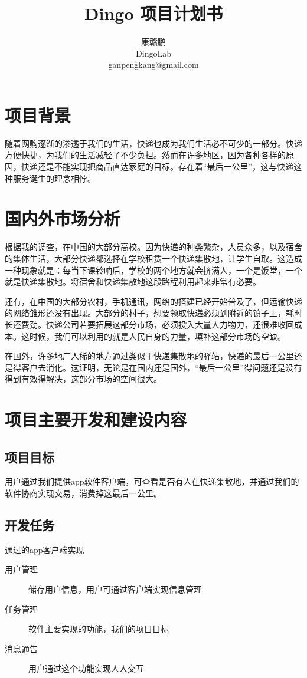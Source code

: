 \documentclass[UTF8]{dingo}
\author{康赣鹏 \\ DingoLab \\ganpengkang@gmail.com}
\title{Dingo 项目计划书}
\begin{document}
  \makecover
  \makecontent
  \section{项目背景}
  随着网购逐渐的渗透于我们的生活，快递也成为我们生活必不可少的一部分。快递方便快捷，为我们的生活减轻了不少负担。然而在许多地区，因为各种各样的原因，快递还是不能实现把商品直达家庭的目标。存在着“最后一公里”，这与快递这种服务诞生的理念相悖。
  \section{国内外市场分析}
  根据我的调查，在中国的大部分高校。因为快递的种类繁杂，人员众多，以及宿舍的集体生活，大部分快递都选择在学校租赁一个快递集散地，让学生自取。这造成一种现象就是：每当下课铃响后，学校的两个地方就会挤满人，一个是饭堂，一个就是快递集散地。将宿舍和快递集散地这段路程利用起来非常有必要。

  还有，在中国的大部分农村，手机通讯，网络的搭建已经开始普及了，但运输快递的网络雏形还没有出现。大部分的村子，想要领取快递必须到附近的镇子上，耗时长还费劲。快递公司若要拓展这部分市场，必须投入大量人力物力，还很难收回成本。这时候，我们可以利用的就是人民自身的力量，填补这部分市场的空缺。

  在国外，许多地广人稀的地方通过类似于快递集散地的驿站，快递的最后一公里还是得客户去消化。这证明，无论是在国内还是国外，“最后一公里”得问题还是没有得到有效得解决，这部分市场的空间很大。

  \section{项目主要开发和建设内容}
    \subsection{项目目标}
    用户通过我们提供app软件客户端，可查看是否有人在快递集散地，并通过我们的软件协商实现交易，消费掉这最后一公里。
    \subsection{开发任务}
    通过的app客户端实现
    \begin{description}
      \item[用户管理] 储存用户信息，用户可通过客户端实现信息管理
      \item[任务管理] 软件主要实现的功能，我们的项目目标
      \item[消息通告] 用户通过这个功能实现人人交互
    \end{description}
\end{document}
